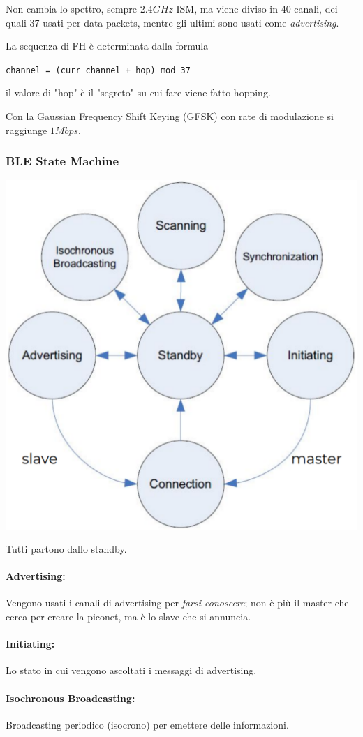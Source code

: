 Non cambia lo spettro, sempre $2.4GHz$ ISM, ma viene diviso in 40 canali, dei quali 37 usati per data packets, mentre gli ultimi sono usati come \textit{advertising}.

La sequenza di FH è determinata dalla formula
\begin{center}
	\texttt{channel = (curr\_channel + hop) mod 37}
\end{center}
il valore di "hop" è il "segreto" su cui fare viene fatto hopping.  

Con la Gaussian Frequency Shift Keying (GFSK) con rate di modulazione si raggiunge $1Mbps$.

\subsubsection{BLE State Machine}
\begin{center}
	\includegraphics[width=0.6\linewidth]{img/wpan/blestate}
\end{center}

Tutti partono dallo standby.

\paragraph{Advertising:} Vengono usati i canali di advertising per \textit{farsi conoscere}; non è più il master che cerca per creare la piconet, ma è lo slave che si annuncia. 

\paragraph{Initiating:} Lo stato in cui vengono ascoltati i messaggi di advertising.

\paragraph{Isochronous Broadcasting:} Broadcasting periodico (isocrono) per emettere delle informazioni.


